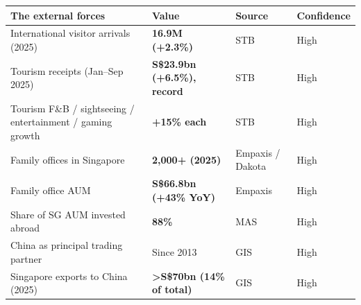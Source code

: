 \documentclass[10pt,twoside,openany]{memoir}
\renewcommand{\arraystretch}{1.1}
\begin{document}
{{{{{{{{{{{{\def\LTcaptype{none} %
{\renewcommand{\arraystretch}{0.9}\begin{longtable}[]{@{}
  >{\raggedright\arraybackslash}p{}
  >{\raggedright\arraybackslash}p{}
  >{\raggedright\arraybackslash}p{}
  >{\raggedright\arraybackslash}p{}@{}}
\toprule\noalign{}
\begin{minipage}[b]{\linewidth}\raggedright
The external forces
\end{minipage} & \begin{minipage}[b]{\linewidth}\raggedright
Value
\end{minipage} & \begin{minipage}[b]{\linewidth}\raggedright
Source
\end{minipage} & \begin{minipage}[b]{\linewidth}\raggedright
Confidence
\end{minipage} \\
\midrule\noalign{}
\endhead
\bottomrule\noalign{}
\endlastfoot
International visitor arrivals (2025) & \textbf{16.9M (+2.3\%)} & STB &
High \\
Tourism receipts (Jan--Sep 2025) & \textbf{S\$23.9bn (+6.5\%), record} &
STB & High \\
Tourism F\&B / sightseeing / entertainment / gaming growth &
\textbf{+15\% each} & STB & High \\
Family offices in Singapore & \textbf{2,000+ (2025)} & Empaxis / Dakota
& High \\
Family office AUM & \textbf{S\$66.8bn (+43\% YoY)} & Empaxis & High \\
Share of SG AUM invested abroad & \textbf{88\%} & MAS & High \\
China as principal trading partner & Since 2013 & GIS & High \\
Singapore exports to China (2025) & \textbf{\textgreater S\$70bn (14\%
of total)} & GIS & High \\
\end{longtable}
}

}}}}}}}}}}}}
\end{document}
